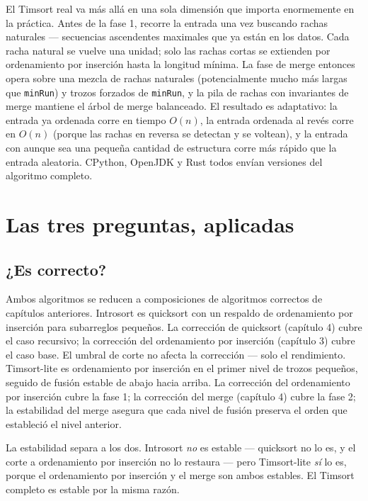 \documentclass[11pt,a4paper]{article}
\begin{document}
El Timsort real va más allá en una sola dimensión que importa enormemente en la práctica. Antes de la fase 1, recorre la entrada una vez buscando rachas naturales --- secuencias ascendentes maximales que ya están en los datos. Cada racha natural se vuelve una unidad; solo las rachas cortas se extienden por ordenamiento por inserción hasta la longitud mínima. La fase de merge entonces opera sobre una mezcla de rachas naturales (potencialmente mucho más largas que \texttt{minRun}) y trozos forzados de \texttt{minRun}, y la pila de rachas con invariantes de merge mantiene el árbol de merge balanceado. El resultado es adaptativo: la entrada ya ordenada corre en tiempo $O(n)$, la entrada ordenada al revés corre en $O(n)$ (porque las rachas en reversa se detectan y se voltean), y la entrada con aunque sea una pequeña cantidad de estructura corre más rápido que la entrada aleatoria. CPython, OpenJDK y Rust todos envían versiones del algoritmo completo.

\section{Las tres preguntas, aplicadas}

\subsection*{¿Es correcto?}

Ambos algoritmos se reducen a composiciones de algoritmos correctos de capítulos anteriores. Introsort es quicksort con un respaldo de ordenamiento por inserción para subarreglos pequeños. La corrección de quicksort (capítulo 4) cubre el caso recursivo; la corrección del ordenamiento por inserción (capítulo 3) cubre el caso base. El umbral de corte no afecta la corrección --- solo el rendimiento. Timsort-lite es ordenamiento por inserción en el primer nivel de trozos pequeños, seguido de fusión estable de abajo hacia arriba. La corrección del ordenamiento por inserción cubre la fase 1; la corrección del merge (capítulo 4) cubre la fase 2; la estabilidad del merge asegura que cada nivel de fusión preserva el orden que estableció el nivel anterior.

La estabilidad separa a los dos. Introsort \emph{no} es estable --- quicksort no lo es, y el corte a ordenamiento por inserción no lo restaura --- pero Timsort-lite \emph{sí} lo es, porque el ordenamiento por inserción y el merge son ambos estables. El Timsort completo es estable por la misma razón.
\end{document}
